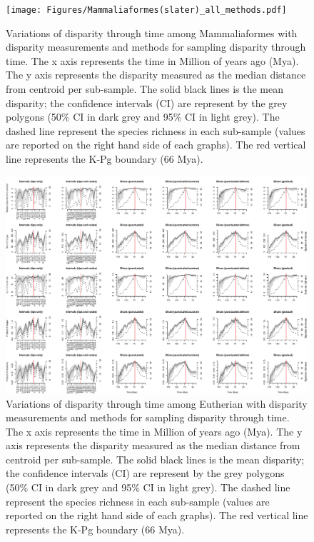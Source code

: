 \documentclass[12pt,letterpaper]{article}
\begin{document}
\begin{landscape}
\begin{figure}[!htbp]
\centering
    \texttt{[image: Figures/Mammaliaformes(slater)\_all\_methods.pdf]}
\caption{Variations of disparity through time among Mammaliaformes with disparity measurements and methods for sampling disparity through time. The x axis represents the time in Million of years ago (Mya). The y axis represents the disparity measured as the median distance from centroid per sub-sample. The solid black lines is the mean disparity; the confidence intervals (CI) are represent by the grey polygons (50\% CI in dark grey and 95\% CI in light grey). The dashed line represent the species richness in each sub-sample (values are reported on the right hand side of each graphs). The red vertical line represents the K-Pg boundary (66 Mya).}
\end{figure}
\end{landscape}

\begin{landscape}
\begin{figure}[!htbp]
\centering
    \includegraphics[width=\textwidth,height=\textheight,keepaspectratio]{Figures/Eutheria(beck)_all_methods.pdf}
\caption{Variations of disparity through time among Eutherian with disparity measurements and methods for sampling disparity through time. The x axis represents the time in Million of years ago (Mya). The y axis represents the disparity measured as the median distance from centroid per sub-sample. The solid black lines is the mean disparity; the confidence intervals (CI) are represent by the grey polygons (50\% CI in dark grey and 95\% CI in light grey). The dashed line represent the species richness in each sub-sample (values are reported on the right hand side of each graphs). The red vertical line represents the K-Pg boundary (66 Mya).}
\end{figure}
\end{landscape}
\end{document}

